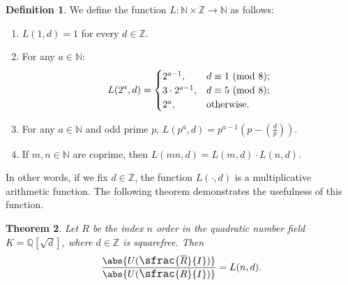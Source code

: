 \documentclass[12pt]{amsart}
\newtheorem{theorem}{Theorem}[section]
\theoremstyle{definition}
\newtheorem{definition}[theorem]{Definition}
\newcommand{\kron}[2]{\left(\frac{#1}{#2}\right)}
\newcommand{\bZ}{\mathbb Z}
\newcommand{\bQ}{\mathbb Q}
\newcommand{\bN}{\mathbb N}
\newcommand{\Rbar}{\overline{R}}
\newcommand{\modulo}[1]{\textup{ (mod }#1)}
\newcommand{\ow}{\textup{otherwise}}
\newcommand{\quot}[2]{\large\sfrac{#1}{#2}\normalsize}
\begin{document}
	\begin{definition}
		\label{l function}
		We define the function $L:\bN\times \bZ\to \bN$ as follows:
		\begin{enumerate}
			\item $L(1,d)=1$ for every $d\in\bZ$.
			\item For any $a\in\bN$:$$L(2^a,d)=\begin{cases} 2^{a-1},&d\equiv 1\modulo{8};\\3\cdot 2^{a-1},&d\equiv 5\modulo{8};\\2^a,&\ow.\end{cases}$$
			\item For any $a\in\bN$ and odd prime $p$, $L(p^a,d)=p^{a-1}\left(p-\kron{d}{p}\right)$.
			\item If $m,n\in\bN$ are coprime, then $L(mn,d)=L(m,d)\cdot L(n,d)$.
		\end{enumerate}
	\end{definition}
	
	In other words, if we fix $d\in\bZ$, the function $L(\cdot,d)$ is a multiplicative arithmetic function. The following theorem demonstrates the usefulness of this function.
	
	\begin{theorem}
		Let $R$ be the index $n$ order in the quadratic number field $K=\bQ[\sqrt{d}]$, where $d\in\bZ$ is squarefree. Then
		$$\frac{\abs{U(\quot{\Rbar}{I})}}{\abs{U(\quot{R}{I})}}=L(n,d).$$
	\end{theorem}
	
\end{document}
